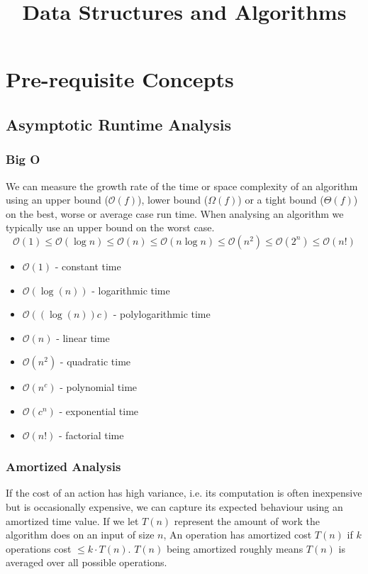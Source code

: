 \documentclass{article}
\title{\vspace{-3cm} Data Structures and Algorithms}
\author{}
\date{}
\newcommand{\bigO}{\ensuremath{\mathcal{O}}}
\begin{document}
\maketitle
\vspace{-1.5cm}
\tableofcontents
\newpage

\section{Pre-requisite Concepts}

    \subsection{Asymptotic Runtime Analysis}
    \subsubsection{Big O}
    We can measure the growth rate of the time or space complexity of an algorithm using an upper bound ($\bigO(f)$), lower bound ($\Omega (f) $) or a tight bound ($\Theta (f)$) on the best, worse or average case run time. When analysing an algorithm we typically use an upper bound on the worst case. 
    \[
        \bigO(1) \leq \bigO(\log n) \leq \bigO(n) \leq \bigO(n \log n) \leq \bigO(n^2) \leq  \bigO(2^n)  \leq \bigO(n!)
    \]
    \begin{multicols}{2}
    \begin{itemize}
        \item[] $\bigO(1)$ - constant time
        \item[] $\bigO(\log(n))$ - logarithmic time
        \item[] $\bigO((\log(n))c)$ - polylogarithmic time
        \item[] $\bigO(n)$ - linear time
        \item[] $\bigO(n^2)$ - quadratic time
        \item[] $\bigO(n^c)$ - polynomial time
        \item[] $\bigO(c^n)$ - exponential time
        \item[] $\bigO(n!)$ - factorial time
    \end{itemize}
    \end{multicols}
    
    \subsubsection{Amortized Analysis}
    If the cost of an action has high variance, i.e. its computation is often inexpensive but is occasionally expensive, we can capture its expected behaviour using an amortized time value. If we let $T(n)$ represent the amount of work the algorithm does on an input of size $n$, An operation has amortized cost $T(n)$ if $k$ operations cost $\leq k \cdot T(n)$. $T(n)$ being amortized roughly means $T(n)$ is averaged over all possible operations. 
    
\end{document}
